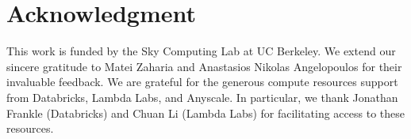\section{Acknowledgment}
This work is funded by the Sky Computing Lab at UC Berkeley. We extend our sincere gratitude to Matei Zaharia and Anastasios Nikolas Angelopoulos for their invaluable feedback. We are grateful for the generous compute resources support from Databricks, Lambda Labs, and Anyscale. In particular, we thank Jonathan Frankle (Databricks) and Chuan Li (Lambda Labs) for facilitating access to these resources.